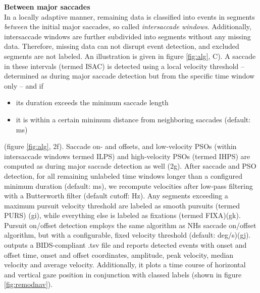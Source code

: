 \textbf{Between major saccades}\\
In a locally adaptive manner, remaining data is classified into events in segments
\textit{between} the initial major saccades, so called \textit{intersaccade windows}. Additionally, intersaccade
windows are further subdivided into segments without any missing data. Therefore, missing data can not disrupt event
detection, and excluded segments are not labeled. An illustration is given in figure \ref{fig:alg}, C). A saccade
in these intervals (termed ISAC) is detected using a local velocity threshold -- determined as during major
saccade detection but from the specific time window only -- and if
\begin{itemize}
    \item its duration exceeds the minimum saccade length
    \item it is within a certain minimum distance from neighboring saccades (default: \unit[130]{ms})
\end{itemize}
(figure \ref{fig:alg}, 2f). Saccade on- and offsets, and low-velocity PSOs (within intersaccade
windows termed ILPS) and high-velocity PSOs (termed IHPS) are computed as during major saccade detection as well
(2g). After saccade and PSO detection, for all remaining unlabeled time windows longer than a configured minimum
duration (default: \unit[40]{ms}), we recompute velocities after low-pass filtering with a Butterworth filter
(default  cutoff: \unit[4]{Hz}). Any segments exceeding a maximum pursuit velocity threshold are labeled as
smooth pursuits  (termed PURS) (gi), while everything else is labeled as fixations (termed FIXA)(gk). Pursuit
on/offset detection  employs the same algorithm as NHs saccade on/offset algorithm, but with a configurable,
fixed velocity threshold (default: \unit[2]{deg/s})(gj). \\
\remodnav outputs a BIDS-compliant \citep{gorgolewski2016brain} .tsv file and
reports detected events with onset and offset time, onset and offset coordinates, amplitude, peak velocity, median
velocity and average velocity. Additionally, it plots a time course of horizontal and vertical gaze position in
conjunction with classed labels (shown in figure \ref{fig:remodnav}).





